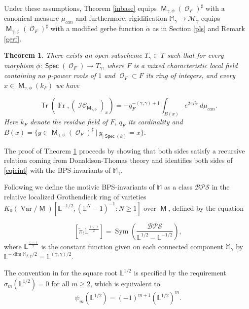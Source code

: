 \documentclass{article}
\DeclareMathOperator{\Oc}{\mathcal{O}}
\DeclareMathOperator{\M}{{\mathsf{M}}}
\DeclareMathOperator{\Tr}{\mathsf{Tr}}
\DeclareMathOperator{\Fr}{Fr}
\DeclareMathOperator{\Spec}{\mathsf{Spec}}
\DeclareMathOperator{\Sym}{Sym}
\DeclareMathOperator{\Oo}{\mathcal{O}}
\DeclareMathOperator{\CIC}{\mathcal{IC}}
\newcommand{\BL}{{\mathbb{L}}}
\newcommand{\BM}{{\mathbb{M}}}
\newcommand{\CM}{{\mathcal M}}
\DeclareMathOperator{\Var}{Var}
\newcommand{\BPS}{\mathcal{BPS} }
\theoremstyle{definition}
\theoremstyle{plain}
\newtheorem{theorem}[definition]{Theorem}
\begin{document}
Under these assumptions, Theorem \ref{inbase} equips $\M_{\gamma,\phi}(\Oc_F)^\sharp$ with a canonical measure $\mu_{can}$ and furthermore, rigidification $\BM_\gamma \to \CM_\gamma$ equips $\M_{\gamma,\phi}(\Oc_F)^\sharp$ with a modified gerbe function $\tilde{\alpha}$ as in Section \ref{pls} and Remark \ref{gerf}.



\begin{theorem}\label{icint} There exists an open subscheme $T_\gamma \subset T$ such that for every morphism $\phi: \Spec(\Oo_F) \to T_\gamma$, where $F$ is a mixed characteristic local field containing no $p$-power roots of $1$ and $\Oc_F \subset F$ its ring of integers, and every $x \in \M_{\gamma,\phi}(k_F)$ we have

\begin{equation}\label{eqicint} \Tr(\Fr,\left(\CIC_{\M_{\gamma,\phi}}\right)_x) = - q_F^{-(\gamma,\gamma)+1} \int_{B(x)} e^{2\pi i\tilde{\alpha}} \ d\mu_{can}.  \end{equation}
Here $k_F$ denote the residue field of $F$, $q_F$ its cardinality and
 $B(x) = \{y \in \M_{\gamma,\phi}(\Oc_F)^\sharp \ |\ y_{|\Spec(k)} = x \}$.
\end{theorem}

The proof of Theorem \ref{icint} proceeds by showing that both sides satisfy a recursive relation coming from Donaldson-Thomas theory and identifies both sides of \eqref{eqicint} with the BPS-invariants of $\BM_\gamma$. 

Following  \cite[Section 6.5]{Me15} we define the motivic BPS-invariants of $\BM$ as a class $\BPS$ in the relative localized Grothendieck ring of varieties $K_0(\Var/\M)[\BL^{-1/2},(\BL^N-1)^{-1} : N \geq 1]$ over $\M$, defined by the equation 

\begin{equation}\label{groexp}[\tilde{\pi}_!\BL^{\frac{(\cdot,\cdot)}{2}}] = \Sym \left( \frac{\BPS}{\BL^{1/2}-\BL^{-1/2}}  \right), \end{equation}
where $\BL^{\frac{(\cdot,\cdot)}{2}}$ is the constant function given on each connected component $\BM_{\gamma}$ by $\BL^{- \dim \BM_{\beta,\chi}/2} = \BL^{(\gamma,\gamma)/2}$. 

The convention in \cite{Me15} for the square root $\BL^{1/2}$ is specified by the requirement $\sigma_m (\BL^{1/2}) = 0$ for all $m\geq 2$, which is equivalent to 
\begin{equation}\label{sqconv} \psi_m(\BL^{1/2}) = (-1)^{m+1} (\BL^{1/2})^m. \end{equation}
\end{document}
